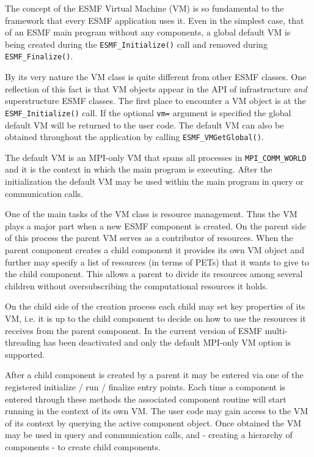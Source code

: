 
The concept of the ESMF Virtual Machine (VM) is so fundamental to the framework that every ESMF application uses it. Even in the simplest case, that of an ESMF main program without any components, a global default VM is being created during the {\tt ESMF\_Initialize()} call and removed during {\tt ESMF\_Finalize()}.

By its very nature the VM class is quite different from other ESMF classes. One reflection of this fact is that VM objects appear in the API of infrastructure {\it and} superstructure ESMF classes. The first place to encounter a VM object is at the {\tt ESMF\_Initialize()} call. If the optional {\tt vm=} argument is specified the global default VM will be returned to the user code. The default VM can also be obtained throughout the application by calling {\tt ESMF\_VMGetGlobal()}.

The default VM is an MPI-only VM that spans all processes in {\tt MPI\_COMM\_WORLD} and it is the context in which the main program is executing. After the initialization the default VM may be used within the main program in query or communication calls. 

One of the main tasks of the VM class is resource management. Thus the VM plays a major part when a new ESMF component is created. On the parent side of this process the parent VM serves as a contributor of resources. When the parent component creates a child component it provides its own VM object and further may specify a list of resources (in terms of PETs) that it wants to give to the child component. This allows a parent to divide its resources among several children without oversubscribing the computational resources it holds.

On the child side of the creation process each child may set key properties of its VM, i.e. it is up to the child component to decide on how to use the resources it receives from the parent component. In the current version of ESMF multi-threading has been deactivated and only the default MPI-only VM option is supported.


After a child component is created by a parent it may be entered via one of the registered initialize / run / finalize entry points. Each time a component is entered through these methods the associated component routine will start running in the context of its own VM. The user code may gain access to the VM of its context by querying the active component object. Once obtained the VM may be used in query and communication calls, and - creating a hierarchy of components - to create child components.
